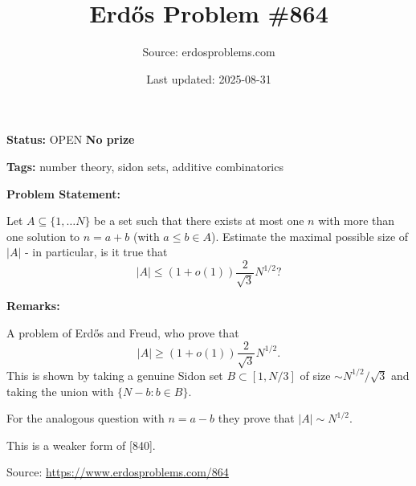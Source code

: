\documentclass{article}
\title{Erd\H{o}s Problem \#864}
\date{Last updated: 2025-08-31}
\author{Source: erdosproblems.com}
\begin{document}
\maketitle

\noindent\textbf{Status:} OPEN \quad \textbf{No prize}

\noindent\textbf{Tags:} number theory, sidon sets, additive combinatorics

\medskip
\noindent\textbf{Problem Statement:}

Let $A\subseteq \{1,\ldots N\}$ be a set such that there exists at most one $n$ with more than one solution to $n=a+b$ (with $a\leq b\in A$). Estimate the maximal possible size of $\lvert A\rvert$ - in particular, is it true that\[\lvert A\rvert \leq (1+o(1))\frac{2}{\sqrt{3}}N^{1/2}?\]

\bigskip
\noindent\textbf{Remarks:}

A problem of Erd\H{o}s and Freud, who prove that\[\lvert A\rvert \geq (1+o(1))\frac{2}{\sqrt{3}}N^{1/2}.\]This is shown by taking a genuine Sidon set $B\subset [1,N/3]$ of size $\sim N^{1/2}/\sqrt{3}$ and taking the union with $\{N-b : b\in B\}$.

For the analogous question with $n=a-b$ they prove that $\lvert A\rvert\sim N^{1/2}$.

This is a weaker form of [840].

\bigskip
\noindent\small{Source: \url{https://www.erdosproblems.com/864}}
\end{document}
